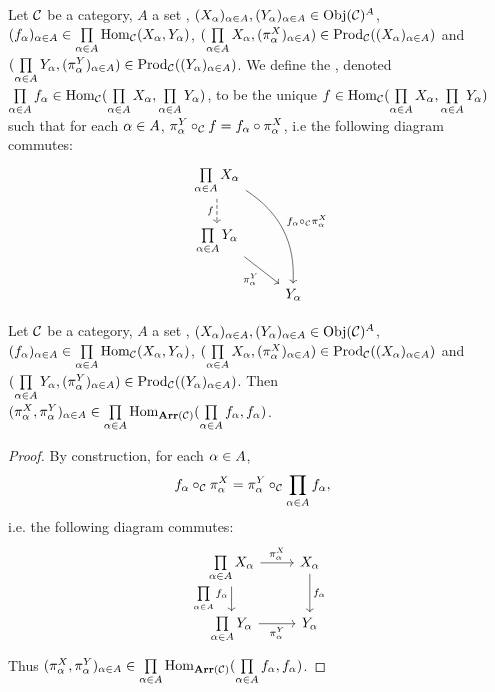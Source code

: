 \documentclass{book}
\begin{document}
	\begin{defn}
		Let $\mathcal{C}$ be a category, $A$ a set , $(X_{\alpha})_{\alpha \in A}, (Y_{\alpha})_{\alpha \in A} \in \operatorname{Obj}(\mathcal{C})^A$, $(f_{\alpha})_{\alpha \in A} \in \prod\limits_{\alpha \in A} \operatorname{Hom}_{\mathcal{C}}(X_{\alpha}, Y_{\alpha})$, $(\prod\limits_{\alpha \in A} X_{\alpha}, (\pi^X_{\alpha})_{\alpha \in A}) \in \operatorname{Prod}_{\mathcal{C}}((X_{\alpha})_{\alpha \in A})$ and $(\prod\limits_{\alpha \in A} Y_{\alpha}, (\pi^Y_{\alpha})_{\alpha \in A}) \in \operatorname{Prod}_{\mathcal{C}}((Y_{\alpha})_{\alpha \in A})$. We define the , denoted $\prod\limits_{\alpha \in A} f_{\alpha} \in \operatorname{Hom}_{\mathcal{C}}(\prod\limits_{\alpha \in A} X_{\alpha}, \prod\limits_{\alpha \in A} Y_{\alpha})$, to be the unique $f \in \operatorname{Hom}_{\mathcal{C}}(\prod\limits_{\alpha \in A} X_{\alpha}, \prod\limits_{\alpha \in A} Y_{\alpha})$ such that for each $\alpha \in A$, $\pi^Y_{\alpha} \circ_{\mathcal{C}} f = f_{\alpha} \circ \pi^X_{\alpha}$, i.e the following diagram commutes:
		\[
		\begin{tikzcd}[baseline= 7]
			\prod\limits_{\al \in A} X_{\al}   \arrow[d, "f"', dashed]  \arrow[ddr, "f_{\al} \circ_{\MC} \pi^X_{\al}"', bend left=30, swap]    &  \\
			\prod\limits_{\al \in A} Y_{\al} \arrow[dr, "\pi^Y_{\al}"']                        & \\
			& Y_{\al}   
		\end{tikzcd}
		\] 
	\end{defn}
	
	\begin{ex}
		Let $\mathcal{C}$ be a category, $A$ a set , $(X_{\alpha})_{\alpha \in A}, (Y_{\alpha})_{\alpha \in A} \in \operatorname{Obj}(\mathcal{C})^A$, $(f_{\alpha})_{\alpha \in A} \in \prod\limits_{\alpha \in A} \operatorname{Hom}_{\mathcal{C}}(X_{\alpha}, Y_{\alpha})$, $(\prod\limits_{\alpha \in A} X_{\alpha}, (\pi^X_{\alpha})_{\alpha \in A}) \in \operatorname{Prod}_{\mathcal{C}}((X_{\alpha})_{\alpha \in A})$ and $(\prod\limits_{\alpha \in A} Y_{\alpha}, (\pi^Y_{\alpha})_{\alpha \in A}) \in \operatorname{Prod}_{\mathcal{C}}((Y_{\alpha})_{\alpha \in A})$. Then $(\pi^X_{\alpha}, \pi^Y_{\alpha})_{\alpha \in A} \in \prod\limits_{\alpha \in A} \operatorname{Hom}_{\operatorname{\textbf{Arr}}(\mathcal{C})}(\prod\limits_{\alpha \in A} f_{\alpha}, f_{\alpha})$.
	\end{ex}
	
	\begin{proof}
		By construction, for each $\alpha \in A$, 
		\begin{align*}
			f_{\alpha} \circ_{\mathcal{C}} \pi^X_{\alpha}
			& = \pi^Y_{\alpha} \circ_{\mathcal{C}} \prod\limits_{\alpha \in A} f_{\alpha},
		\end{align*}
		i.e. the following diagram commutes:
		\[ 
		\begin{tikzcd}[baseline= 7]
			\prod\limits_{\al \in A} X_{\al}  \arrow[r, "\pi^X_{\al}"]  \arrow[d, "\prod\limits_{\al \in A} f_{\al}"']  & X_{\al}   \arrow[d, "f_{\al}"]\\
			\prod\limits_{\al \in A} Y_{\al} \arrow[r, "\pi^Y_{\al}"'] &  Y_{\al}
		\end{tikzcd}
		\]
		Thus $(\pi^X_{\alpha}, \pi^Y_{\alpha})_{\alpha \in A} \in \prod\limits_{\alpha \in A} \operatorname{Hom}_{\operatorname{\textbf{Arr}}(\mathcal{C})}(\prod\limits_{\alpha \in A} f_{\alpha}, f_{\alpha})$.
	\end{proof}
	
\end{document}
